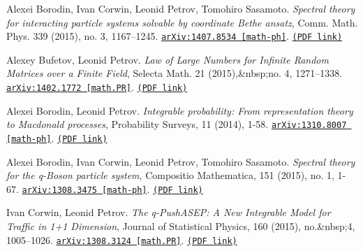 \begin{etaremune}
\item 
Alexei Borodin, Ivan Corwin, Leonid Petrov, Tomohiro Sasamoto.
\emph{Spectral theory for interacting particle systems solvable by coordinate Bethe ansatz}, Comm. Math. Phys. 339 (2015), no. 3, 1167–1245. 
\href{https://arxiv.org/abs/1407.8534}{\texttt{arXiv:1407.8534 [math-ph]}}. \href{https://storage.lpetrov.cc/research_files/Petrov-publ/17-publ-petrov-uva.pdf}{\texttt{(PDF link)}}





\item 
Alexey Bufetov, Leonid Petrov.
\emph{Law of Large Numbers for Infinite Random Matrices over a Finite Field}, Selecta Math. 21 (2015),&nbsp;no. 4, 1271–1338. 
\href{https://arxiv.org/abs/1402.1772}{\texttt{arXiv:1402.1772 [math.PR]}}. \href{https://storage.lpetrov.cc/research_files/Petrov-publ/16-publ-petrov.pdf}{\texttt{(PDF link)}}













\item 
Alexei Borodin, Leonid Petrov.
\emph{Integrable probability: From representation theory to Macdonald processes}, Probability Surveys, 11 (2014), 1-58. 
\href{https://arxiv.org/abs/1310.8007}{\texttt{arXiv:1310.8007 [math-ph]}}. \href{https://storage.lpetrov.cc/research_files/Petrov-publ/15-publ-petrov.pdf}{\texttt{(PDF link)}}





\item 
Alexei Borodin, Ivan Corwin, Leonid Petrov, Tomohiro Sasamoto.
\emph{Spectral theory for the q-Boson particle system}, Compositio Mathematica, 151 (2015), no. 1, 1-67. 
\href{https://arxiv.org/abs/1308.3475}{\texttt{arXiv:1308.3475 [math-ph]}}. \href{https://storage.lpetrov.cc/research_files/Petrov-publ/14-publ-petrov.pdf}{\texttt{(PDF link)}}



\item 
Ivan Corwin, Leonid Petrov.
\emph{The q-PushASEP: A New Integrable Model for Traffic in 1+1 Dimension}, Journal of Statistical Physics, 160 (2015), no.&nbsp;4, 1005–1026. 
\href{https://arxiv.org/abs/1308.3124}{\texttt{arXiv:1308.3124 [math.PR]}}. \href{https://storage.lpetrov.cc/research_files/Petrov-publ/13-publ-petrov.pdf}{\texttt{(PDF link)}}






\end{etaremune}
